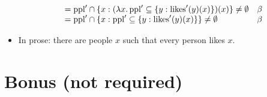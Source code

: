 \begin{itemize}
\[\begin{array}{c}
\begin{array}{r@{}ll}
				\\
				&{}= \text{ppl}' \cap \{x : (\lambda x.\,\text{ppl}' \subseteq \{y : \text{likes}'(y)(x)\})(x)\} \neq \emptyset & \beta%
				\\
				&{}= \text{ppl}' \cap \{x : \text{ppl}' \subseteq \{y : \text{likes}'(y)(x)\}\} \neq \emptyset & \beta%
				\\
			\end{array}
		\end{array}\]
		\item In prose: there are people $x$ such that every person likes $x$.
	\end{itemize}


\section{Bonus (not required)}

